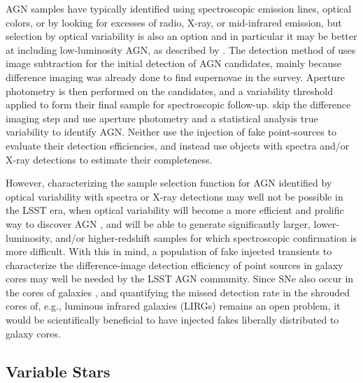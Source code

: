 \documentclass[DM,lsstdraft,toc]{lsstdoc}
\begin{document}
AGN samples have typically identified using spectroscopic emission lines, optical colors, or by looking for excesses of radio, X-ray, or mid-infrared emission, but selection by optical variability is also an option and in particular it may be better at including low-luminosity AGN, as described by \cite[e.g.,][]{2008A&A...488...73T,2010ApJ...723..737V}. The detection method of \cite{2008A&A...488...73T} uses image subtraction for the initial detection of AGN candidates, mainly because difference imaging was already done to find supernovae in the survey. Aperture photometry is then performed on the candidates, and a variability threshold applied to form their final sample for spectroscopic follow-up. \cite{2010ApJ...723..737V} skip the difference imaging step and use aperture photometry and a statistical analysis true variability to identify AGN. Neither use the injection of fake point-sources to evaluate their detection efficiencies, and instead use objects with spectra and/or X-ray detections to estimate their completeness. %

However, characterizing the sample selection function for AGN identified by optical variability with spectra or X-ray detections may well not be possible in the LSST era, when optical variability will become a more efficient and prolific way to discover AGN \cite[e.g.,][]{2014ApJ...782...37C}, and will be able to generate significantly larger, lower-luminosity, and/or higher-redshift samples for which spectroscopic confirmation is more difficult. With this in mind, a population of fake injected transients to characterize the difference-image detection efficiency of point sources in galaxy cores may well be needed by the LSST AGN community. Since SNe also occur in the cores of galaxies \citep[e.g.,][]{2009A&A...507L..17P,2012ApJ...744L..19K}, and quantifying the missed detection rate in the shrouded cores of, e.g., luminous infrared galaxies (LIRGs) remains an open problem, it would be scientifically beneficial to have injected fakes liberally distributed to galaxy cores.

\subsection{Variable Stars}\label{ssec:sci_varstar}
\end{document}
